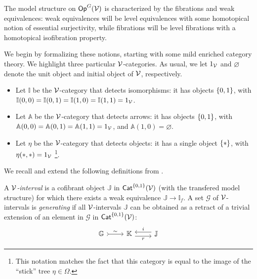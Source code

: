 \documentclass[a4paper,10pt
,draft
]{article}%
\newcommand{\I}{\mathbb I}
\newcommand{\J}{\mathbb J}
\renewcommand{\1}{\eta}%
\begin{document}

The model structure on $\mathsf{Op}^G(\mathcal V)$ is characterized by the fibrations and weak equivalences:
weak equivalences will be level equivalences with some homotopical notion of essential surjectivity,
while fibrations will be level fibrations with a homotopical isofibration property.

We begin by formalizing these notions, starting with some mild enriched category theory.
We highlight three particular $\mathcal V$-categories.
As usual, we let $1_{\mathcal V}$ and $\varnothing$ denote the unit object and initial object of $\mathcal V$, respectively.
\begin{itemize} %
\item Let $\I$ be the $\mathcal V$-category that detects isomorphisms: it has objects $\left\{0,1\right\}$,
      with $\I(0,0) = \I(0,1) = \I(1,0) = \I(1,1) = 1_\V$.
\item Let $\mathbb A$ be the $\mathcal V$-category that detects arrows: it has objects $\left\{0,1\right\}$,
      with $\mathbb A(0,0) = \mathbb A(0,1) = \mathbb A(1,1) = 1_{\mathcal V}$, and $\mathbb A(1,0) = \varnothing$.
\item Let $\1$ be the $\mathcal V$-category that detects objects: it has a single object $\set{\**}$, with $\1(\**, \**) = 1_\V$
      \footnote{
        This notation matches the fact that this category is equal to the image of the ``stick'' tree $\eta \in \Omega$.}.
\end{itemize}

We recall and extend the following definitions from \cite{BM13}. 

\begin{definition}
      A {\em $\mathcal V$-interval} is a cofibrant object $\J$ in $\mathsf{Cat}^{\left\{0,1\right\}}(\mathcal V)$ (with the transfered model structure)
      for which there exists a weak equivalence $\J \to \I_f$.
      A set $\mathcal{G}$ of $\mathcal V$-intervals is {\em generating} if all $\mathcal V$-intervals $\J$ can be obtained
      as a retract of a trivial extension of an element in $\mathcal{G}$ in $\mathsf{Cat}^{\left\{0,1\right\}}(\mathcal V)$:
      \begin{equation}
            \begin{tikzcd}
                  \mathbb{G} \arrow[r,rightarrowtail, "\sim"]
                  &
                  \mathbb{K} \arrow[r,yshift=-.3em, "r"']
                  &
                  \mathbb{J} \arrow[l,yshift=.3em, "i"']
            \end{tikzcd}
      \end{equation}
\end{definition}
\end{document}
